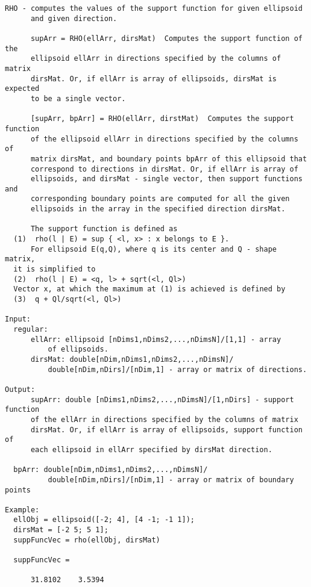 \begin{verbatim}
RHO - computes the values of the support function for given ellipsoid
      and given direction.

      supArr = RHO(ellArr, dirsMat)  Computes the support function of the
      ellipsoid ellArr in directions specified by the columns of matrix
      dirsMat. Or, if ellArr is array of ellipsoids, dirsMat is expected
      to be a single vector.

      [supArr, bpArr] = RHO(ellArr, dirstMat)  Computes the support function
      of the ellipsoid ellArr in directions specified by the columns of
      matrix dirsMat, and boundary points bpArr of this ellipsoid that
      correspond to directions in dirsMat. Or, if ellArr is array of
      ellipsoids, and dirsMat - single vector, then support functions and
      corresponding boundary points are computed for all the given
      ellipsoids in the array in the specified direction dirsMat.

      The support function is defined as
  (1)  rho(l | E) = sup { <l, x> : x belongs to E }.
      For ellipsoid E(q,Q), where q is its center and Q - shape matrix,
  it is simplified to
  (2)  rho(l | E) = <q, l> + sqrt(<l, Ql>)
  Vector x, at which the maximum at (1) is achieved is defined by
  (3)  q + Ql/sqrt(<l, Ql>)

Input:
  regular:
      ellArr: ellipsoid [nDims1,nDims2,...,nDimsN]/[1,1] - array
          of ellipsoids.
      dirsMat: double[nDim,nDims1,nDims2,...,nDimsN]/
          double[nDim,nDirs]/[nDim,1] - array or matrix of directions.

Output:
      supArr: double [nDims1,nDims2,...,nDimsN]/[1,nDirs] - support function
      of the ellArr in directions specified by the columns of matrix
      dirsMat. Or, if ellArr is array of ellipsoids, support function of
      each ellipsoid in ellArr specified by dirsMat direction.

  bpArr: double[nDim,nDims1,nDims2,...,nDimsN]/
          double[nDim,nDirs]/[nDim,1] - array or matrix of boundary points

Example:
  ellObj = ellipsoid([-2; 4], [4 -1; -1 1]);
  dirsMat = [-2 5; 5 1];
  suppFuncVec = rho(ellObj, dirsMat)

  suppFuncVec =

      31.8102    3.5394
\end{verbatim}
